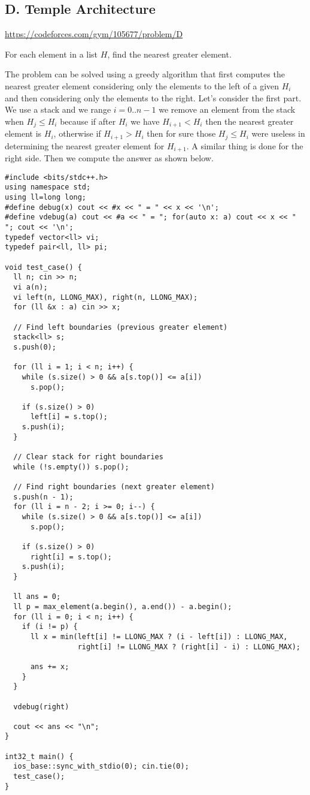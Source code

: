 \subsection{D. Temple Architecture}
\url{https://codeforces.com/gym/105677/problem/D} \\

\begin{problem}
    For each element in a list $H$, find the nearest greater element.
\end{problem}

The problem can be solved using a greedy algorithm that first computes the nearest greater element considering only the elements to the left of a given $H_i$ and then considering only the elements to the right. 
Let's consider the first part. We use a stack and we range $i = 0..n-1$ we remove an element from the stack when $H_j \leq H_i$ because if after $H_i$ we have $H_{i+1} < H_i$ then the nearest greater element is $H_i$, otherwise if $H_{i+1} > H_i$ then for sure those $H_j \leq H_i$ were useless in determining the nearest greater element for $H_{i+1}$. A similar thing is done for the right side. Then we compute the answer as shown below.

\begin{verbatim}
#include <bits/stdc++.h>
using namespace std;
using ll=long long;
#define debug(x) cout << #x << " = " << x << '\n';
#define vdebug(a) cout << #a << " = "; for(auto x: a) cout << x << " "; cout << '\n';
typedef vector<ll> vi;
typedef pair<ll, ll> pi;

void test_case() {
  ll n; cin >> n;
  vi a(n);
  vi left(n, LLONG_MAX), right(n, LLONG_MAX);
  for (ll &x : a) cin >> x;

  // Find left boundaries (previous greater element)
  stack<ll> s;
  s.push(0);

  for (ll i = 1; i < n; i++) {
    while (s.size() > 0 && a[s.top()] <= a[i])
      s.pop();

    if (s.size() > 0)
      left[i] = s.top();
    s.push(i);
  }

  // Clear stack for right boundaries
  while (!s.empty()) s.pop();
  
  // Find right boundaries (next greater element)
  s.push(n - 1);
  for (ll i = n - 2; i >= 0; i--) {
    while (s.size() > 0 && a[s.top()] <= a[i])
      s.pop();

    if (s.size() > 0)
      right[i] = s.top();
    s.push(i);
  }

  ll ans = 0;
  ll p = max_element(a.begin(), a.end()) - a.begin();
  for (ll i = 0; i < n; i++) {
    if (i != p) {
      ll x = min(left[i] != LLONG_MAX ? (i - left[i]) : LLONG_MAX, 
                 right[i] != LLONG_MAX ? (right[i] - i) : LLONG_MAX);

      ans += x;
    }
  }

  vdebug(right)
  
  cout << ans << "\n";
}

int32_t main() {
  ios_base::sync_with_stdio(0); cin.tie(0);
  test_case();
}   
\end{verbatim}


